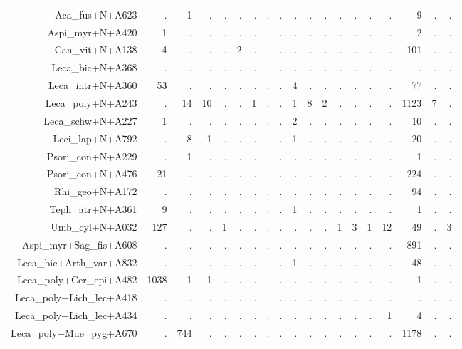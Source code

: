 \documentclass[a4paper, 11]{article}\usepackage[]{graphicx}\usepackage[]{color}
\begin{document}
\begin{table}
\begin{tabular}{rrrrrrrrrrrrrrrrrrr}
  \hline
Aca\_fus+N+A623 & . & 1 & . & . & . & . & . & . & . & . & . & . & . & . & . & 9 & . & . \\ 
  Aspi\_myr+N+A420 & 1 & . & . & . & . & . & . & . & . & . & . & . & . & . & . & 2 & . & . \\ 
  Can\_vit+N+A138 & 4 & . & . & . & 2 & . & . & . & . & . & . & . & . & . & . & 101 & . & . \\ 
  Leca\_bic+N+A368 & . & . & . & . & . & . & . & . & . & . & . & . & . & . & . & . & . & . \\ 
  Leca\_intr+N+A360 & 53 & . & . & . & . & . & . & . & 4 & . & . & . & . & . & . & 77 & . & . \\ 
  Leca\_poly+N+A243 & . & 14 & 10 & . & . & 1 & . & . & 1 & 8 & 2 & . & . & . & . & 1123 & 7 & . \\ 
  Leca\_schw+N+A227 & 1 & . & . & . & . & . & . & . & 2 & . & . & . & . & . & . & 10 & . & . \\ 
  Leci\_lap+N+A792 & . & 8 & 1 & . & . & . & . & . & 1 & . & . & . & . & . & . & 20 & . & . \\ 
  Psori\_con+N+A229 & . & 1 & . & . & . & . & . & . & . & . & . & . & . & . & . & 1 & . & . \\ 
  Psori\_con+N+A476 & 21 & . & . & . & . & . & . & . & . & . & . & . & . & . & . & 224 & . & . \\ 
  Rhi\_geo+N+A172 & . & . & . & . & . & . & . & . & . & . & . & . & . & . & . & 94 & . & . \\ 
  Teph\_atr+N+A361 & 9 & . & . & . & . & . & . & . & 1 & . & . & . & . & . & . & 1 & . & . \\ 
  Umb\_cyl+N+A032 & 127 & . & . & 1 & . & . & . & . & . & . & . & 1 & 3 & 1 & 12 & 49 & . & 3 \\ 
  Aspi\_myr+Sag\_fis+A608 & . & . & . & . & . & . & . & . & . & . & . & . & . & . & . & 891 & . & . \\ 
  Leca\_bic+Arth\_var+A832 & . & . & . & . & . & . & . & . & 1 & . & . & . & . & . & . & 48 & . & . \\ 
  Leca\_poly+Cer\_epi+A482 & 1038 & 1 & 1 & . & . & . & . & . & . & . & . & . & . & . & . & 1 & . & . \\ 
  Leca\_poly+Lich\_lec+A418 & . & . & . & . & . & . & . & . & . & . & . & . & . & . & . & . & . & . \\ 
  Leca\_poly+Lich\_lec+A434 & . & . & . & . & . & . & . & . & . & . & . & . & . & . & 1 & 4 & . & . \\ 
  Leca\_poly+Mue\_pyg+A670 & . & 744 & . & . & . & . & . & . & . & . & . & . & . & . & . & 1178 & . & . \\ 

\end{tabular}
\end{table}
\end{document}
